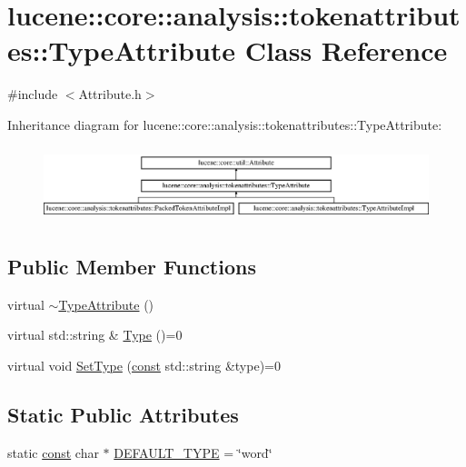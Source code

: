 \hypertarget{classlucene_1_1core_1_1analysis_1_1tokenattributes_1_1TypeAttribute}{}\section{lucene\+:\+:core\+:\+:analysis\+:\+:tokenattributes\+:\+:Type\+Attribute Class Reference}
\label{classlucene_1_1core_1_1analysis_1_1tokenattributes_1_1TypeAttribute}


{\ttfamily \#include $<$Attribute.\+h$>$}

Inheritance diagram for lucene\+:\+:core\+:\+:analysis\+:\+:tokenattributes\+:\+:Type\+Attribute\+:\begin{figure}[H]
\begin{center}
\leavevmode
\includegraphics[height=2.210526cm]{classlucene_1_1core_1_1analysis_1_1tokenattributes_1_1TypeAttribute}
\end{center}
\end{figure}
\subsection*{Public Member Functions}
\begin{DoxyCompactItemize}
\item 
virtual \mbox{\hyperlink{classlucene_1_1core_1_1analysis_1_1tokenattributes_1_1TypeAttribute_afbe663aff604b5af062b90f1e65d529e}{$\sim$\+Type\+Attribute}} ()
\item 
virtual std\+::string \& \mbox{\hyperlink{classlucene_1_1core_1_1analysis_1_1tokenattributes_1_1TypeAttribute_a85bef723dc92f76228982ff3907c5d04}{Type}} ()=0
\item 
virtual void \mbox{\hyperlink{classlucene_1_1core_1_1analysis_1_1tokenattributes_1_1TypeAttribute_abb4ecef2fd30c7b659efd7f3a2086945}{Set\+Type}} (\mbox{\hyperlink{ZlibCrc32_8h_a2c212835823e3c54a8ab6d95c652660e}{const}} std\+::string \&type)=0
\end{DoxyCompactItemize}
\subsection*{Static Public Attributes}
\begin{DoxyCompactItemize}
\item 
static \mbox{\hyperlink{ZlibCrc32_8h_a2c212835823e3c54a8ab6d95c652660e}{const}} char $\ast$ \mbox{\hyperlink{classlucene_1_1core_1_1analysis_1_1tokenattributes_1_1TypeAttribute_acb727b71590b34060e7d915afb885c27}{D\+E\+F\+A\+U\+L\+T\+\_\+\+T\+Y\+PE}} = \char`\"{}word\char`\"{}
\end{DoxyCompactItemize}
